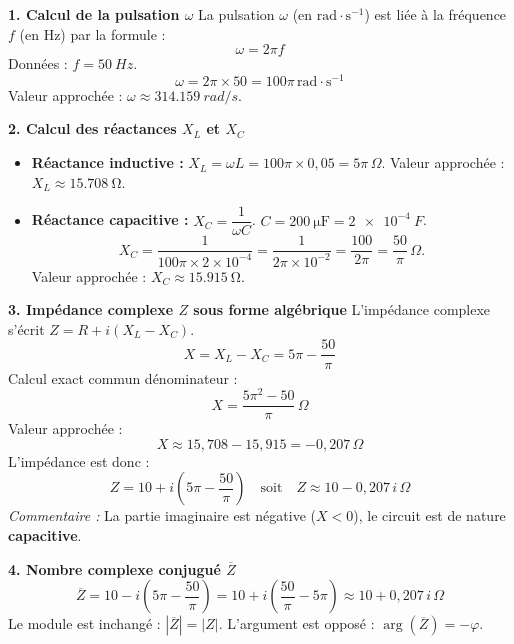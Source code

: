 \documentclass[11pt]{article}
\begin{document}
\begin{exoresolu}

\textbf{1. Calcul de la pulsation $\omega$}
La pulsation $\omega$ (en $\text{rad}\cdot\text{s}^{-1}$) est liée à la fréquence $f$ (en Hz) par la formule :
\[ \omega = 2\pi f \]
Données : $f = \SI{50}{Hz}$.
\[ \omega = 2\pi \times 50 = 100\pi\,\text{rad}\cdot\text{s}^{-1} \]
Valeur approchée : $\omega \approx \SI{314,159}{rad/s}$.

\textbf{2. Calcul des réactances $X_L$ et $X_C$}
\begin{itemize}
    \item \textbf{Réactance inductive :} $X_L = \omega L = 100\pi \times 0,05 = 5\pi\,\Omega$.
    Valeur approchée : $X_L \approx \SI{15,708}{\ohm}$.
    \item \textbf{Réactance capacitive :} $X_C = \dfrac{1}{\omega C}$.
    $C = \SI{200}{\micro\farad} = \SI{2e-4}{F}$.
    \[ X_C = \frac{1}{100\pi \times 2 \times 10^{-4}} = \frac{1}{2\pi \times 10^{-2}} = \frac{100}{2\pi} = \frac{50}{\pi}\,\Omega. \]
    Valeur approchée : $X_C \approx \SI{15,915}{\ohm}$.
\end{itemize}

\textbf{3. Impédance complexe $Z$ sous forme algébrique}
L'impédance complexe s'écrit $Z = R + i(X_L - X_C)$.
\[ X = X_L - X_C = 5\pi - \frac{50}{\pi} \]
Calcul exact commun dénominateur :
\[ X = \frac{5\pi^2 - 50}{\pi}\,\Omega \]
Valeur approchée :
\[ X \approx 15,708 - 15,915 = -0,207\,\Omega \]
L'impédance est donc :
\[ Z = 10 + i\left(5\pi - \frac{50}{\pi}\right) \quad \text{soit} \quad Z \approx 10 - 0,207\,i \,\Omega \]
\emph{Commentaire :} La partie imaginaire est négative ($X < 0$), le circuit est de nature \textbf{capacitive}.

\textbf{4. Nombre complexe conjugué $\overline{Z}$}
\[ \overline{Z} = 10 - i\left(5\pi - \frac{50}{\pi}\right) = 10 + i\left(\frac{50}{\pi} - 5\pi\right) \approx 10 + 0,207\,i \,\Omega \]
Le module est inchangé : $|\overline{Z}| = |Z|$. L'argument est opposé : $\arg(\overline{Z}) = -\varphi$.


\end{exoresolu}
\end{document}
